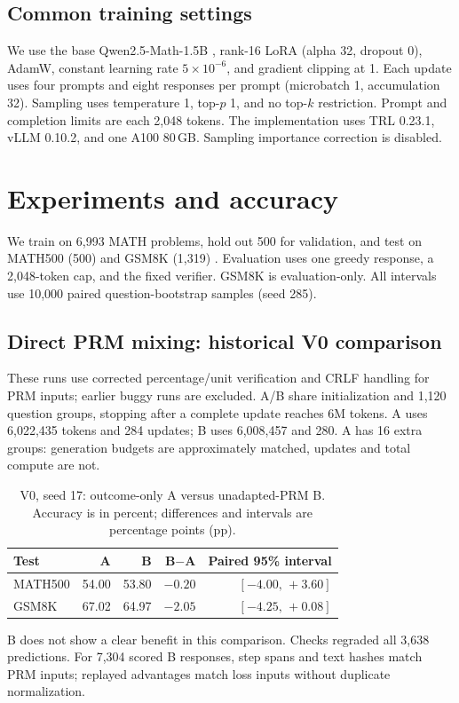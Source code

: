 \documentclass{article}
\begin{document}
\subsection{Common training settings}
We use the base Qwen2.5-Math-1.5B \citep{yang2024}, rank-16 LoRA (alpha 32, dropout 0), AdamW, constant learning rate $5\times10^{-6}$, and gradient clipping at 1. Each update uses four prompts and eight responses per prompt (microbatch 1, accumulation 32). Sampling uses temperature 1, top-$p$ 1, and no top-$k$ restriction. Prompt and completion limits are each 2,048 tokens. The implementation uses TRL 0.23.1, vLLM 0.10.2, and one A100 80\,GB. Sampling importance correction is disabled.

\clearpage
\section{Experiments and accuracy}
We train on 6,993 MATH problems, hold out 500 for validation, and test on MATH500 (500) and GSM8K (1,319) \citep{hendrycks2021,cobbe2021}. Evaluation uses one greedy response, a 2,048-token cap, and the fixed verifier. GSM8K is evaluation-only. All intervals use 10,000 paired question-bootstrap samples (seed 285).

\subsection{Direct PRM mixing: historical V0 comparison}
These runs use corrected percentage/unit verification and CRLF handling for PRM inputs; earlier buggy runs are excluded. A/B share initialization and 1,120 question groups, stopping after a complete update reaches 6M tokens. A uses 6,022,435 tokens and 284 updates; B uses 6,008,457 and 280. A has 16 extra groups: generation budgets are approximately matched, updates and total compute are not.

\begin{table}[h!]
\caption{V0, seed 17: outcome-only A versus unadapted-PRM B. Accuracy is in percent; differences and intervals are percentage points (pp).}
\centering\small
\begin{tabular}{@{}lrrrr@{}}
\toprule
Test & A & B & B$-$A & Paired 95\% interval \\
\midrule
MATH500 & 54.00 & 53.80 & $-0.20$ & $[-4.00,\,+3.60]$ \\
GSM8K & 67.02 & 64.97 & $-2.05$ & $[-4.25,\,+0.08]$ \\
\bottomrule
\end{tabular}\label{tab:main}
\end{table}
B does not show a clear benefit in this comparison. Checks regraded all 3,638 predictions. For 7,304 scored B responses, step spans and text hashes match PRM inputs; replayed advantages match loss inputs without duplicate normalization.
\end{document}
